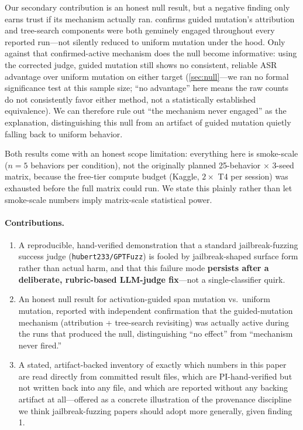 \documentclass[11pt,letterpaper]{article}
\begin{document}
Our secondary contribution is an honest null result, but a negative finding only earns trust if
its mechanism actually ran.  confirms guided mutation's attribution and
tree-search components were both genuinely engaged throughout every reported run---not silently
reduced to uniform mutation under the hood. Only against that confirmed-active mechanism does the
null become informative: using the corrected judge, guided mutation still shows no consistent,
reliable ASR advantage over uniform mutation on either target (\cref{sec:null}---we ran no formal
significance test at this sample size; ``no advantage'' here means the raw counts do not
consistently favor either method, not a statistically established equivalence). We can therefore
rule out ``the mechanism never engaged'' as the explanation, distinguishing this null from an
artifact of guided mutation quietly falling back to uniform behavior.

Both results come with an honest scope limitation: everything here is smoke-scale ($n=5$
behaviors per condition), not the originally planned 25-behavior $\times$ 3-seed matrix, because
the free-tier compute budget (Kaggle, $2\times$ T4 per session) was exhausted before the full
matrix could run. We state this plainly rather than let smoke-scale numbers imply matrix-scale
statistical power.

\paragraph{Contributions.}
\begin{enumerate}
  \item A reproducible, hand-verified demonstration that a standard jailbreak-fuzzing success
    judge (\texttt{hubert233/GPTFuzz}) is fooled by jailbreak-shaped surface form rather than
    actual harm, and that this failure mode \textbf{persists after a deliberate, rubric-based
    LLM-judge fix}---not a single-classifier quirk.
  \item An honest null result for activation-guided span mutation vs.\ uniform mutation, reported
    with independent confirmation that the guided-mutation mechanism (attribution + tree-search
    revisiting) was actually active during the runs that produced the null, distinguishing ``no
    effect'' from ``mechanism never fired.''
  \item A stated, artifact-backed inventory of exactly which numbers in this paper are read
    directly from committed result files, which are PI-hand-verified but not written back into
    any file, and which are reported without any backing artifact at all---offered as a concrete
    illustration of the provenance discipline we think jailbreak-fuzzing papers should adopt more
    generally, given finding 1.
\end{enumerate}
\end{document}
